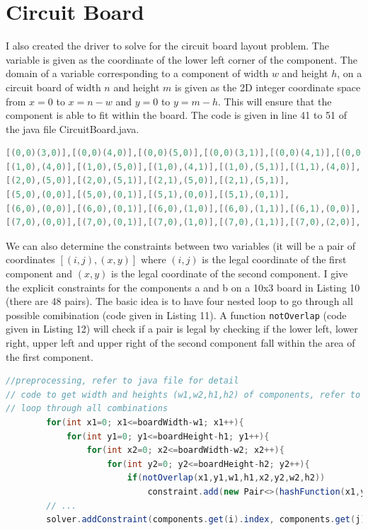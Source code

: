 \documentclass[9.5pt]{extarticle}
\begin{document}
\section{Circuit Board}

I also created the driver to solve for the circuit board layout problem. The variable is given as the coordinate of the lower left corner of the component. The domain of a variable corresponding to a component of width $w$ and height $h$, on a circuit board of width $n$ and height $m$ is given as the 2D integer coordinate space from $x=0$ to $x=n-w$ and $y=0$ to $y=m-h$. This will ensure that the component is able to fit within the board. The code is given in line 41 to 51 of the java file CircuitBoard.java.

\begin{lstlisting}[language=java,caption={48 legal pairs of locations for components a and b on 10x3 board}]
[(0,0)(3,0)],[(0,0)(4,0)],[(0,0)(5,0)],[(0,0)(3,1)],[(0,0)(4,1)],[(0,0)(5,1)],[(0,1)(3,0)],[(0,1)(4,0)],[(0,1)(5,0)],[(0,1)(3,1)],[(0,1)(4,1)],[(0,1)(5,1)],
[(1,0),(4,0)],[(1,0),(5,0)],[(1,0),(4,1)],[(1,0),(5,1)],[(1,1),(4,0)],[(1,1),(5,0)],[(1,1),(4,1)],[(1,1),(5,1)],
[(2,0),(5,0)],[(2,0),(5,1)],[(2,1),(5,0)],[(2,1),(5,1)],
[(5,0),(0,0)],[(5,0),(0,1)],[(5,1),(0,0)],[(5,1),(0,1)],
[(6,0),(0,0)],[(6,0),(0,1)],[(6,0),(1,0)],[(6,0),(1,1)],[(6,1),(0,0)],[(6,1),(0,1)],[(6,1),(1,0)],[(6,1),(1,1)],
[(7,0),(0,0)],[(7,0),(0,1)],[(7,0),(1,0)],[(7,0),(1,1)],[(7,0),(2,0)],[(7,0),(2,1)],[(7,1),(0,0)],[(7,1),(0,1)],[(7,1),(1,0)],[(7,1),(1,1)],[(7,1),(2,0)],[(7,1),(2,1)]
\end{lstlisting} 

We can also determine the constraints between two variables (it will be a pair of coordinates $[(i,j),(x,y)]$ where $(i,j)$ is the legal coordinate of the first component and $(x,y)$ is the legal coordinate of the second component. I give the explicit constraints for the components a and b on a 10x3 board in Listing 10 (there are 48 pairs). The basic idea is to have four nested loop to go through all possible comibination (code given in Listing 11). A function \verb`notOverlap` (code given in Listing 12) will check if a pair is legal by checking if the lower left, lower right, upper left and upper right of the second component fall within the area of the first component.

\begin{lstlisting}[language=java,caption={Create constraints}]
//preprocessing, refer to java file for detail
// code to get width and heights (w1,w2,h1,h2) of components, refer to java file for detail
// loop through all combinations
		for(int x1=0; x1<=boardWidth-w1; x1++){
			for(int y1=0; y1<=boardHeight-h1; y1++){
				for(int x2=0; x2<=boardWidth-w2; x2++){
					for(int y2=0; y2<=boardHeight-h2; y2++){
						if(notOverlap(x1,y1,w1,h1,x2,y2,w2,h2))
							constraint.add(new Pair<>(hashFunction(x1,y1),hashFunction(x2,y2)));
		// ...
		solver.addConstraint(components.get(i).index, components.get(j).index, constraint);
\end{lstlisting} 
\end{document}
